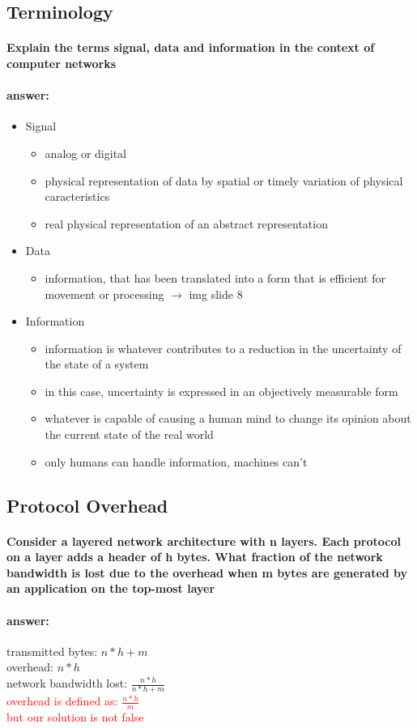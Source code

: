 \documentclass[a4paper,11pt]{article}
\begin{document}
  \subsection{Terminology}
 \paragraph{Explain the terms signal, data and information in the context of computer networks}
 \paragraph{answer:}
 \begin{itemize}
 	\item Signal
 	\begin{itemize}
 		\item  analog or digital
 		\item  physical representation of data by spatial or timely variation of physical caracteristics
 		\item  real physical representation of an abstract representation
 	\end{itemize}
 
 	\item Data
 	\begin{itemize}
 		\item  information, that has been translated into a form that is efficient for movement or processing
 		$\rightarrow$ img slide 8 
 	\end{itemize}
 
 	\item Information
 	\begin{itemize}
 		\item  information is whatever contributes to a reduction in the uncertainty of the state of a system
 		\item  in this case, uncertainty is expressed in an objectively measurable form
 		\item  whatever is capable of causing a human mind to change its opinion about the current state of the real world
 		\item  only humans can handle information, machines can't
 	\end{itemize}
 \end{itemize}
 
  \subsection{Protocol Overhead}
 \paragraph{Consider a layered network architecture with n layers. Each protocol on a layer adds a header of h bytes. What fraction of the network bandwidth is lost due to the overhead when m bytes are generated by an application on the top-most layer}
 \paragraph{answer:} 

 transmitted bytes: $n * h + m$ \\
 overhead: $n * h$ \\
 network bandwidth lost: $\frac{n * h}{n * h + m}$
 \\
 \textcolor{red}{overhead is defined as: $\frac{n * h}{m}$ \\
 but our solution is not false}
 

 
\end{document}
